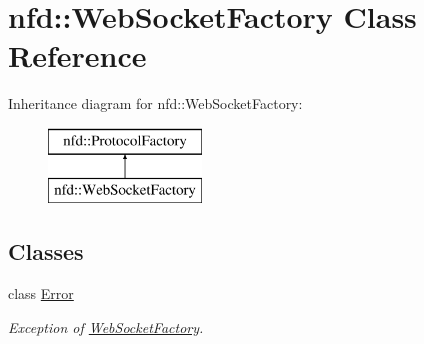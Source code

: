 \hypertarget{classnfd_1_1WebSocketFactory}{}\section{nfd\+:\+:Web\+Socket\+Factory Class Reference}
\label{classnfd_1_1WebSocketFactory}
Inheritance diagram for nfd\+:\+:Web\+Socket\+Factory\+:\begin{figure}[H]
\begin{center}
\leavevmode
\includegraphics[height=2.000000cm]{classnfd_1_1WebSocketFactory}
\end{center}
\end{figure}
\subsection*{Classes}
\begin{DoxyCompactItemize}
\item 
class \hyperlink{classnfd_1_1WebSocketFactory_1_1Error}{Error}
\begin{DoxyCompactList}\small\item\em Exception of \hyperlink{classnfd_1_1WebSocketFactory}{Web\+Socket\+Factory}. \end{DoxyCompactList}\end{DoxyCompactItemize}
